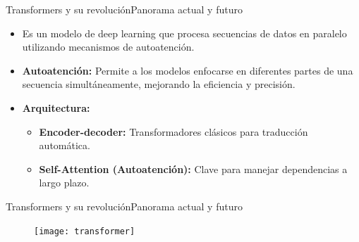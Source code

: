 \documentclass[10pt,border=3pt,tikz]{beamer}
\begin{document}
    \begin{frame}{Transformers y su revolución}{Panorama actual y futuro}
        \begin{itemize}
            \item Es un modelo de deep learning que procesa secuencias de datos en paralelo utilizando mecanismos de autoatención.
            \item \textbf{Autoatención:} Permite a los modelos enfocarse en diferentes partes de una secuencia simultáneamente, mejorando la eficiencia y precisión.
            \item \textbf{Arquitectura:}
            \begin{itemize}
                \item \textbf{Encoder-decoder:} Transformadores clásicos para traducción automática.
                \item \textbf{Self-Attention (Autoatención):} Clave para manejar dependencias a largo plazo.
            \end{itemize}
        \end{itemize}
    \end{frame}
    
    \begin{frame}{Transformers y su revolución}{Panorama actual y futuro}
        \begin{figure}
            \centering
            \texttt{[image: transformer]}
        \end{figure}
    \end{frame}
    
\end{document}
